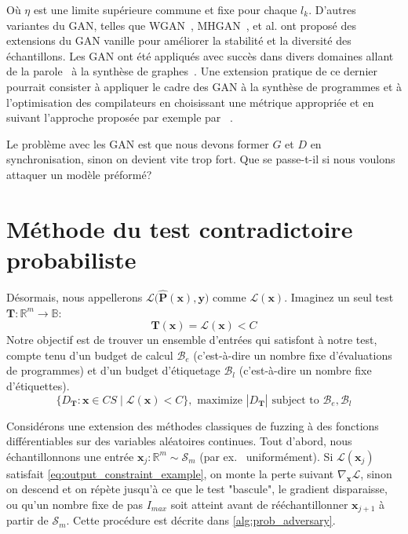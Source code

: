 Où $\eta$ est une limite supérieure commune et fixe pour chaque $l_k$. D'autres variantes du GAN, telles que WGAN~\citep{arjovsky2017wgan}, MHGAN~\citep{turner2019mhgan}, et al. ont proposé des extensions du GAN vanille pour améliorer la stabilité et la diversité des échantillons. Les GAN ont été appliqués avec succès dans divers domaines allant de la parole~\citep{donahue2019wavegan} à la synthèse de graphes~\citep{wang2018graphgan}. Une extension pratique de ce dernier pourrait consister à appliquer le cadre des GAN à la synthèse de programmes et à l'optimisation des compilateurs en choisissant une métrique appropriée et en suivant l'approche proposée par exemple par ~\citet{adams2019learning, mendis2019compiler}.

Le problème avec les GAN est que nous devons former $G$ et $D$ en synchronisation, sinon on devient vite trop fort. Que se passe-t-il si nous voulons attaquer un modèle préformé?
%
\section{Méthode du test contradictoire probabiliste}\label{sec:prob_ad_test}

\noindent Désormais, nous appellerons $\mathcal{L}\big(\mathbf{\hat P}(\mathbf{x}), \mathbf{y}\big)$ comme $\mathcal{L}(\mathbf x)$. Imaginez un seul test $\mathbf{T}: \mathbb{R}^m \rightarrow \mathbb{B}$:
%
\begin{equation} \label{eq:output_constraint_example}
\mathbf T(\mathbf{x}) = \mathcal{L}(\mathbf{x}) < C
\end{equation}
%
Notre objectif est de trouver un ensemble d'entrées qui satisfont à notre test, compte tenu d'un budget de calcul $\mathcal{B}_e$ (c'est-à-dire un nombre fixe d'évaluations de programmes) et d'un budget d'étiquetage $\mathcal{B}_l$ (c'est-à-dire un nombre fixe d'étiquettes).
%
\begin{equation}
\{ D_\mathbf T: \mathbf x \in CS \mid \mathcal{L}(\mathbf{x}) < C\}, \text{ maximize } |D_\mathbf T| \text { subject to } \mathcal{B}_e, \mathcal{B}_l
\end{equation}
%

Considérons une extension des méthodes classiques de fuzzing à des fonctions différentiables sur des variables aléatoires continues. Tout d'abord, nous échantillonnons une entrée $\mathbf{x}_j: \mathbb{R}^m \sim \mathcal S_m$ (par ex. \ uniformément). Si $\mathcal{L}(\mathbf{x}_j)$ satisfait \autoref{eq:output_constraint_example}, on monte la perte suivant $\nabla_{\mathbf x}\mathcal{L}$, sinon on descend et on répète jusqu'à ce que le test "bascule", le gradient disparaisse, ou qu'un nombre fixe de pas $I_{max}$ soit atteint avant de rééchantillonner $\mathbf{x}_{j+1}$ à partir de $\mathcal S_m$. Cette procédure est décrite dans \autoref{alg:prob_adversary}.

